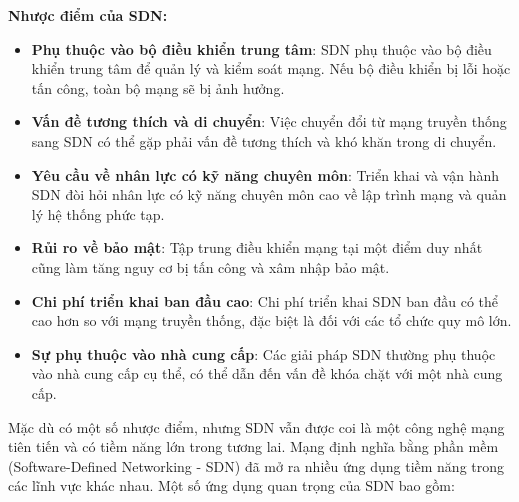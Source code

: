 \documentclass[a4paper]{article}
\begin{document}
\textbf{Nhược điểm của SDN:}
\begin{itemize}
    \item \textbf{Phụ thuộc vào bộ điều khiển trung tâm}: SDN phụ thuộc vào bộ điều khiển trung tâm để quản lý và kiểm soát mạng. Nếu bộ điều khiển bị lỗi hoặc tấn công, toàn bộ mạng sẽ bị ảnh hưởng.
    \item \textbf{Vấn đề tương thích và di chuyển}: Việc chuyển đổi từ mạng truyền thống sang SDN có thể gặp phải vấn đề tương thích và khó khăn trong di chuyển.
    \item \textbf{Yêu cầu về nhân lực có kỹ năng chuyên môn}: Triển khai và vận hành SDN đòi hỏi nhân lực có kỹ năng chuyên môn cao về lập trình mạng và quản lý hệ thống phức tạp.
    \item \textbf{Rủi ro về bảo mật}: Tập trung điều khiển mạng tại một điểm duy nhất cũng làm tăng nguy cơ bị tấn công và xâm nhập bảo mật.
    \item  \textbf{Chi phí triển khai ban đầu cao}: Chi phí triển khai SDN ban đầu có thể cao hơn so với mạng truyền thống, đặc biệt là đối với các tổ chức quy mô lớn.
    \item \textbf{Sự phụ thuộc vào nhà cung cấp}: Các giải pháp SDN thường phụ thuộc vào nhà cung cấp cụ thể, có thể dẫn đến vấn đề khóa chặt với một nhà cung cấp.
\end{itemize}
Mặc dù có một số nhược điểm, nhưng SDN vẫn được coi là một công nghệ mạng tiên tiến và có tiềm năng lớn trong tương lai. Mạng định nghĩa bằng phần mềm (Software-Defined Networking - SDN) đã mở ra nhiều ứng dụng tiềm năng trong các lĩnh vực khác nhau. Một số ứng dụng quan trọng của SDN bao gồm:
\end{document}
